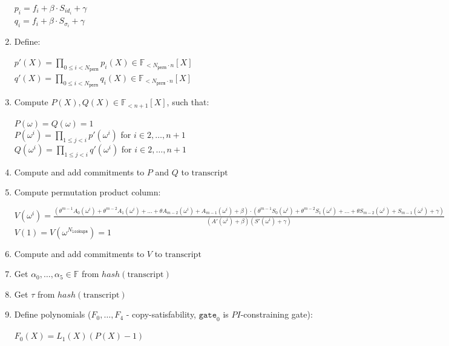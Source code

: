\begin{enumerate}
\begin{center}
            $p_i = f_i + \beta \cdot S_{id_i} + \gamma$ \\
            $q_i = f_i + \beta \cdot S_{\sigma_i} + \gamma$
        \end{center}
    \item Define:
        \begin{center}
            $p'(X) = \prod\limits_{0 \leq i < N_{\texttt{perm}}} p_i(X) \in \mathbb{F}_{<N_{\texttt{perm}} \cdot n}[X]$ \\
            $q'(X) = \prod\limits_{0 \leq i < N_{\texttt{perm}}} q_i(X) \in \mathbb{F}_{<N_{\texttt{perm}} \cdot n}[X]$
        \end{center}
    \item Compute $P(X), Q(X) \in \mathbb{F}_{<n+1}[X]$, such that:
        \begin{center}
            $P(\omega) = Q(\omega) = 1$ \\
            $P(\omega^i) = \prod\limits_{1 \leq j < i}p'(\omega^i)$ for $i \in {2, \dots, n + 1}$ \\
            $Q(\omega^i) = \prod\limits_{1 \leq j < i}q'(\omega^i)$ for $i \in {2, \dots, n + 1}$ \\
        \end{center}
    \item Compute and add commitments to $P$ and $Q$ to $\text{transcript}$
    \item Compute permutation product column:
        \begin{center}
            $V (\omega^i) = \frac{(\theta^{m-1} A_0(\omega^i) + \theta^{m-2} A_1(\omega^i) + ... + \theta A_{m-2}(\omega^i) + A_{m-1}(\omega^i) + \beta) \cdot (\theta^{m-1} S_0(\omega^i) + \theta^{m-2} S_1(\omega^i) + ... + \theta S_{m-2}(\omega^i) + S_{m-1}(\omega^i) + \gamma)} {(A'(\omega^i) + \beta) (S'(\omega^i) + \gamma)}$ \\
            $V (1) = V (\omega^{N_{\texttt{lookups}}}) = 1$
        \end{center}
    \item Compute and add commitments to $V$ to $\text{transcript}$
    \item Get $\alpha_0, \dots, \alpha_5 \in \mathbb{F}$ from $hash(\text{transcript})$
    \item Get $\tau$ from $hash(\text{transcript})$
    \item Define polynomials ($F_0, \dots, F_4$ - copy-satisfability, $\texttt{gate}_0$ is $PI$-constraining gate):
        \begin{center}
            $F_0(X) = L_1(X)(P(X) - 1)$\\

\end{center}
\end{enumerate}
